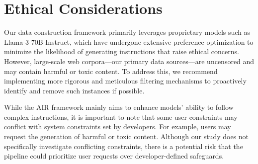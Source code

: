 \section*{Ethical Considerations}
Our data construction framework primarily leverages proprietary models such as Llama-3-70B-Instruct, which have undergone extensive preference optimization to minimize the likelihood of generating instructions that raise ethical concerns. However, large-scale web corpora—our primary data sources—are uncensored and may contain harmful or toxic content. To address this, we recommend implementing more rigorous and meticulous filtering mechanisms to proactively identify and remove such instances if possible.

While the AIR framework mainly aims to enhance models' ability to follow complex instructions, it is important to note that some user constraints may conflict with system constraints set by developers. For example, users may request the generation of harmful or toxic content. Although our study does not specifically investigate conflicting constraints, there is a potential risk that the pipeline could prioritize user requests over developer-defined safeguards.